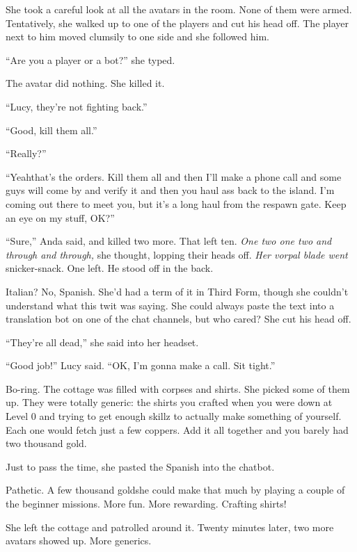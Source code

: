 She took a careful look at all the avatars in the room. None of
them were armed. Tentatively, she walked up to one of the players
and cut his head off. The player next to him moved clumsily to one
side and she followed him.

“Are you a player or a bot?” she typed.

The avatar did nothing. She killed it.

“Lucy, they’re not fighting back.”

“Good, kill them all.”

“Really?”

“Yeah\dash{}that’s the orders. Kill them all and then I’ll make a phone
call and some guys will come by and verify it and then you haul ass
back to the island. I’m coming out there to meet you, but it’s a
long haul from the respawn gate. Keep an eye on my stuff, OK?”

“Sure,” Anda said, and killed two more. That left ten.
\emph{One two one two and through and through,} she thought,
lopping their heads off. \emph{Her vorpal blade went}
snicker-snack. One left. He stood off in the back.

Italian? No, Spanish. She’d had a term of it in Third Form, though
she couldn’t understand what this twit was saying. She could always
paste the text into a translation bot on one of the chat channels,
but who cared? She cut his head off.

“They’re all dead,” she said into her headset.

“Good job!” Lucy said. “OK, I’m gonna make a call. Sit tight.”

Bo-ring. The cottage was filled with corpses and shirts. She picked
some of them up. They were totally generic: the shirts you crafted
when you were down at Level 0 and trying to get enough skillz to
actually make something of yourself. Each one would fetch just a
few coppers. Add it all together and you barely had two thousand
gold.

Just to pass the time, she pasted the Spanish into the chatbot.

Pathetic. A few thousand golds\dash{}he could make that much by playing a
couple of the beginner missions. More fun. More rewarding. Crafting
shirts!

She left the cottage and patrolled around it. Twenty minutes later,
two more avatars showed up. More generics.

